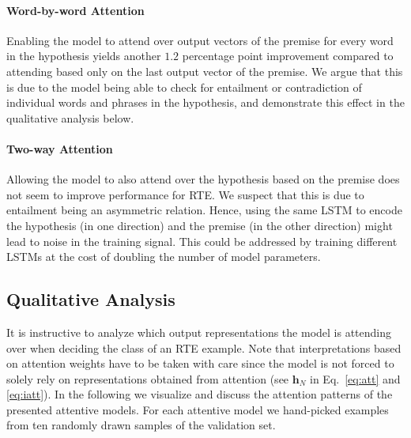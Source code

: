 \documentclass{article}
\begin{document}
\paragraph{Word-by-word Attention} Enabling the model to attend over output vectors of the premise for every word in the hypothesis yields another $1.2$ percentage point improvement compared to attending based only on the last output vector of the premise.
We argue that this is due to the model being able to check for entailment or contradiction of individual words and phrases in the hypothesis, and demonstrate this effect in the qualitative analysis below.

\paragraph{Two-way Attention}
Allowing the model to also attend over the hypothesis based on the premise does not seem to improve performance for RTE.
We suspect that this is due to entailment being an asymmetric relation.
Hence, using the same LSTM to encode the hypothesis (in one direction) and the premise (in the other direction) might lead to noise in the training signal.
This could be addressed by training different LSTMs at the cost of doubling the number of model parameters.

\subsection{Qualitative Analysis}
\label{sec:analysis}
It is instructive to analyze which output representations the model is attending over when deciding the class of an RTE example.
Note that interpretations based on attention weights have to be taken with care  since the model is not forced to solely rely on representations obtained from attention (see $\mathbf{h}_N$ in Eq.~\ref{eq:att} and \ref{eq:iatt}).
In the following we visualize and discuss the attention patterns of the presented attentive models.
For each attentive model we hand-picked examples from ten randomly drawn samples of the validation set.
\end{document}
